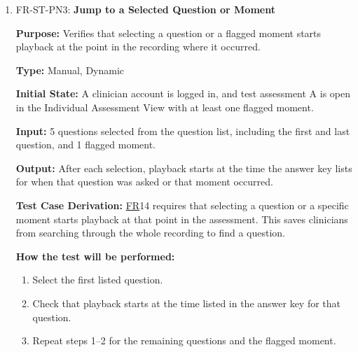 \documentclass[12pt, titlepage]{article}
\newcommand{\srsfr}[1]{\href{https://github.com/Nour-Fawaz/MacaBoca/blob/main/pdfs/SRS/SRS.pdf}{FR}}
\renewcommand{\_}{\oldunderscore\allowbreak}
\begin{document}
\begin{enumerate}
  \item FR-ST-PN3: \textbf{Jump to a Selected Question or Moment\\}
  \begin{mdframed}[linewidth=0.5mm]
      \textbf{Purpose:} Verifies that selecting a question or a flagged moment starts playback at the point in the recording where it occurred. \par
      \textbf{Type:} Manual, Dynamic \par
      \textbf{Initial State:} A clinician account is logged in, and test assessment A is open in the Individual Assessment View with at least one flagged moment. \par
      \textbf{Input:} 5 questions selected from the question list, including the first and last question, and 1 flagged moment. \par
      \textbf{Output:} After each selection, playback starts at the time the answer key lists for when that question was asked or that moment occurred. \par
      \textbf{Test Case Derivation:} \srsfr*{14} requires that selecting a question or a specific moment starts playback at that point in the assessment. This saves clinicians from searching through the whole recording to find a question. \par
      \textbf{How the test will be performed:}
      \begin{enumerate}
        \item[1.] Select the first listed question.
        \item[2.] Check that playback starts at the time listed in the answer key for that question.
        \item[3.] Repeat steps 1--2 for the remaining questions and the flagged moment.
      \end{enumerate}
  \end{mdframed}


\end{enumerate}
\end{document}
